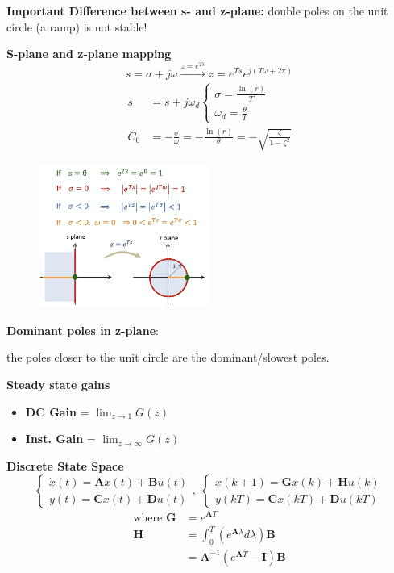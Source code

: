 \textbf{Important Difference between s- and z-plane:} double poles on the unit circle (a ramp) is not stable!

\textbf{\large S-plane and z-plane mapping}
\begin{equation*}
    s=\sigma + j\omega \xrightarrow{z=e^{Ts}} z = e^{Ts}e^{j(T\omega + 2 \pi)}
\end{equation*}
\begin{align*}
    s &= s+ j \omega_d \begin{cases}
    \sigma = \frac{\ln(r)}{T} \\
    \omega_d = \frac{\theta}{T}
    \end{cases} \\
    C_0 &= -\frac{\sigma}{\omega} = - \frac{\ln(r)}{\theta} = -\sqrt{\frac{\zeta}{1-\zeta^2}} 
\end{align*}
\begin{figure}[H]
    \centering
    \includegraphics[width=0.5\textwidth]{images/s_z_mapping.png}
\end{figure}

\textbf{\large Dominant poles in z-plane}: 

the poles closer to the unit circle are the dominant/slowest poles.

\textbf{\large Steady state gains}
\begin{itemize}
    \item \textbf{DC Gain} = $\lim_{z\to 1} G(z)$ 
    \item \textbf{Inst. Gain} = $\lim_{z\to \infty} G(z)$
\end{itemize}

\textbf{\large Discrete State Space}
\begin{equation*}
    \begin{cases}
     \dot{x}(t) = \bm{A}x(t) + \bm{B}u(t) \\
     y(t) = \bm{C}x(t)+\bm{D} u(t)
    \end{cases}, \; \begin{cases}
     x(k+1) = \bm{G}x(k) + \bm{H}u(k) \\
     y(kT) = \bm{C}x(kT) + \bm{D}u(kT)
    \end{cases}
\end{equation*}
\begin{align*}
    \text{where } \bm{G} &= e^{\bm{A}T} \\
    \bm{H} &= \int_{0}^{T}\left(e^{\bm{A}\lambda} d\lambda\right) \bm{B} \\
    &= \bm{A}^{-1} (e^{\bm{A}T}- \bm{I})\bm{B}
\end{align*}
